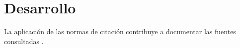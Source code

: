 \section{Desarrollo}


La aplicación de las normas de citación contribuye a documentar las fuentes consultadas \parencite{normaAPA7}.